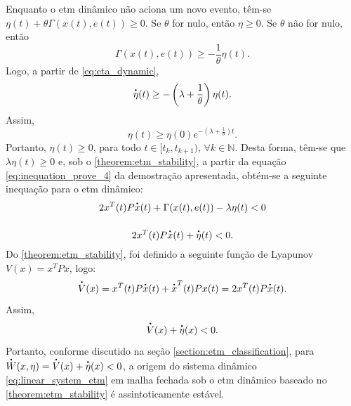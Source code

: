 Enquanto o \acrshort{etm} dinâmico não aciona um novo evento, têm-se $\eta(t) + \theta \Gamma(x(t), e(t)) \geq 0$. Se $\theta$ for nulo, então $\eta \geq 0$. Se $\theta$ não for nulo, então \begin{equation}
  \Gamma(x(t), e(t)) \geq - \frac{1}{\theta}\eta(t).
\end{equation} Logo, a partir de \eqref{eq:eta_dynamic},  \begin{equation}
  \dt{\eta}(t) \geq - \left(\lambda + \frac{1}{\theta}\right) \eta(t).
\end{equation} Assim, \begin{equation}
  \eta(t) \geq \eta(0) e ^ {-\left(\lambda + \frac{1}{\theta}\right) t}.
\end{equation} Portanto, $\eta(t) \geq 0$, para todo $t \in [t_k, t_{k+1}), \, \forall k \in \mathbb{N}$. Desta forma, têm-se que $\lambda \eta(t) \geq 0$ e, sob o \autoref{theorem:etm_stability}, a partir da equação \eqref{eq:inequation_prove_4} da demostração apresentada, obtém-se a seguinte inequação para o \acrshort{etm} dinâmico: \begin{gather}
  2x^T(t) P\dt{x}(t) + \Gamma(x(t), e(t)) - \lambda \eta(t) < 0 \notag \\[12pt]
  2x^T(t) P\dt{x}(t) + \dt{\eta}(t) < 0.
\end{gather} Do \autoref{theorem:etm_stability}, foi definido a seguinte função de Lyapunov $V(x) = x^TPx$, logo: \begin{equation}\dt{V}(x) = x^T(t)P\dt{x}(t) + \dt{x}^T(t)Px(t) = 2x^T(t) P\dt{x}(t).\end{equation} Assim, \begin{equation}
  \dt{V}(x) + \dt{\eta}(x) < 0.
\end{equation} Portanto, conforme discutido na seção \ref{section:etm_classification}, para $\dt{W}(x, \eta) = \dt{V}(x) + \dt{\eta}(x) < 0$, a origem do sistema dinâmico \eqref{eq:linear_system_etm} em malha fechada sob o \acrshort{etm} dinâmico baseado no \autoref{theorem:etm_stability} é assintoticamente estável.

